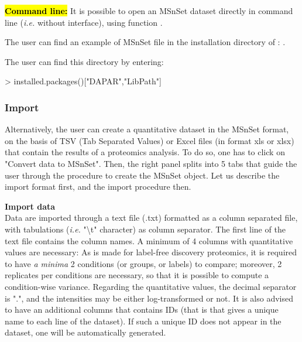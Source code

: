 \documentclass[12pt]{article}
\begin{document}
\hl{\bf Command line:} It is possible to open an MSnSet dataset directly in 
command line (\emph{i.e.} without  interface), using 
function .

{The user can find an example of MSnSet file in the installation directory 
of :\newline
{}}. \newline

The user can find this directory by entering:

\begin{Schunk}
\begin{Sinput}
> installed.packages()["DAPAR","LibPath"]
\end{Sinput}
\end{Schunk}


% 


\subsubsection{Import}\label{sec:import}
Alternatively, the user can create a quantitative dataset in the MSnSet 
format, on the basis of TSV (Tab Separated Values) or Excel files (in format xls or xlsx) that 
contain the results of a proteomics analysis. To do so, one has to click 
on "Convert data to MSnSet". Then, the right panel splits into 5 tabs that 
guide the user through the procedure to create the MSnSet object. Let us describe the import format first, and the import procedure then. 

\noindent \textbf{Import data}\\
\noindent Data are imported through a text file (.txt) formatted as a column separated file, with tabulations (\textit{i.e.} "\textbackslash{}t" character) as column separator.
The first line of the text file contains the column names. A minimum of 4 columns with quantitative values are necessary: As  is made for label-free discovery proteomics, it is required to have \textit{a minima} 2 conditions (or groups, or labels) to compare; moreover, 2 replicates per conditions are necessary, so that it is possible to compute a condition-wise variance. Regarding the quantitative values, the decimal separator is ".", and the intensities may be either log-transformed or not. It is also advised to have an additional columns that contains IDs (that is that gives a unique name to each line of the dataset). If such a unique ID does not appear in the dataset, one will be automatically generated.
\end{document}
